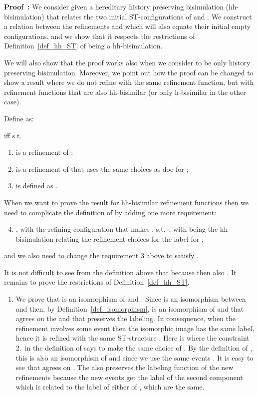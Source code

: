 \documentclass[submission,copyright,creativecommons]{eptcs}
\newenvironment{proof}[1][\!\!\,]{\vspace{1ex}\noindent\textbf{Proof #1: }}{\hfill\vspace{2ex}}
\newcounter{case}
\begin{document}
\begin{proof}
We consider given a hereditary history preserving bisimulation (hh-bisimulation)  that relates the two initial ST-configurations of  and . We construct a relation  between the refinements  and  which will also equate their initial empty configurations, and we show that it respects the restrictions of Definition~\ref{def_hh_ST} of being a hh-bisimulation.

We will also show that the proof works also when we consider  to be only history preserving bisimulation. Moreover, we point out how the proof can be changed to show a result where we do not refine with the same refinement function, but with refinement functions that are also hh-bisimilar (or only h-bisimilar in the other case).

Define  as:

 iff  s.t.
\begin{enumerate}
\item  is a refinement of ;

\item  is a refinement of  that uses the same choices as doe for ;

\item  is defined as .
\end{enumerate}

When we want to prove the result for hh-bisimilar refinement functions  then we need to complicate the definition of  by adding one more requirement:
\begin{enumerate}
\setcounter{enumi}{3}
\item , with  the refining configuration that makes ,  s.t.\ , with  being the hh-bisimulation relating the refinement choices for the label  for ;
\end{enumerate}
and we also need to change the requirement 3 above to satisfy .

It is not difficult to see from the definition above that because  then also  .
It remains to prove the restrictions of Definition~\ref{def_hh_ST}.

\begin{enumerate} 
\item We prove that  is an isomorphism of  and . Since  is an isomorphism between  and  then, by Definition~\ref{def_isomorphism},  is an isomorphism of  and  that agrees on the  and that preserves the labeling. In consequence, when the refinement  involves some event  then the isomorphic image  has the same label, hence it is refined with the same ST-structure . Here is where the constraint 2.\ in the definition of  says to make the same choice of .
By the definition of , this is also an isomorphism of  and  since we use the same events . It is easy to see that  agrees on . The  also preserves the labeling function of the new refinements because the new events get the label of the second component  which is related to the label of either  of , which are the same.


\end{enumerate}
\end{proof}
\end{document}
